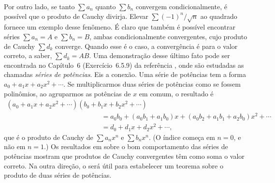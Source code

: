 Por outro lado, se tanto $\sum a_n$ quanto $\sum b_n$ convergem condicionalmente, é possível que o produto de Cauchy divirja. Elevar $\sum (-1)^n/\sqrt{n}$ ao quadrado fornece um exemplo desse fenômeno. É claro que também é possível encontrar séries $\sum a_n = A$ e $\sum b_n = B$, ambas condicionalmente convergentes, cujo produto de Cauchy $\sum d_k$ converge. Quando esse é o caso, a convergência é para o valor correto, a saber, $\sum d_k = AB$. Uma demonstração desse último fato pode ser encontrada no Capítulo~6 (Exercício~6.5.9) da referência
\cite{MR3331079}, onde são estudadas as chamadas \textit{séries de potências}. 
Eis a conexão. Uma série de potências tem a forma $a_0 + a_1 x + a_2 x^2 + \cdots$. 
Se multiplicarmos duas séries de potências como se fossem polinômios, 
ao agruparmos as potências de $x$ em comum, o resultado é
\[
\begin{array}{l}
(a_0 + a_1 x + a_2 x^2 + \cdots)(b_0 + b_1 x + b_2 x^2 + \cdots) 
\\[0.3cm]
\qquad\qquad\qquad\qquad\qquad\qquad\qquad  = a_0 b_0 + (a_0 b_1 + a_1 b_0)x + (a_0 b_2 + a_1 b_1 + a_2 b_0)x^2 + \cdots 
\\[0.3cm]
\qquad\qquad\qquad\qquad\qquad\qquad\qquad  = d_0 + d_1 x + d_2 x^2 + \cdots,
\end{array}
\]
que é o produto de Cauchy de $\sum a_n x^n$ e $\sum b_n x^n$. (O índice começa em $n = 0$, e não em $n = 1$.) Os resultados em \cite{MR3331079} sobre o bom comportamento das séries de potências 
mostram que produtos de Cauchy convergentes têm como soma o valor correto. 
Na outra direção, o  será útil para estabelecer um teorema sobre o produto de duas séries de potências.
